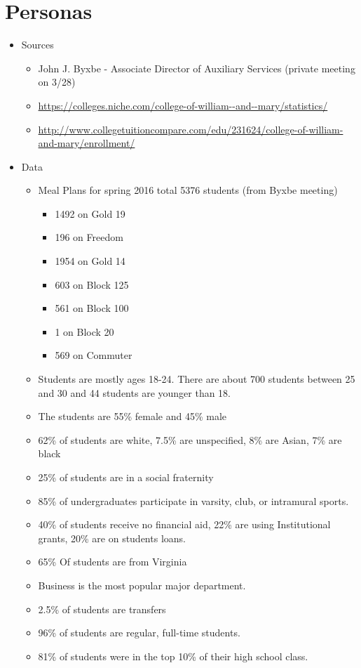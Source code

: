 \documentclass[5pt]{article} %
\begin{document}
\section{Personas}

\begin{itemize}
\item Sources
\begin{itemize}
\item John J. Byxbe - Associate Director of Auxiliary Services (private meeting on 3/28)
\item \url{https://colleges.niche.com/college-of-william--and--mary/statistics/}
\item \url{http://www.collegetuitioncompare.com/edu/231624/college-of-william-and-mary/enrollment/}
\end{itemize}
\item Data
\begin{itemize}
\item Meal Plans for spring 2016 total 5376 students (from Byxbe meeting)
\begin{itemize}
\item 1492 on Gold 19
\item 196 on Freedom
\item 1954 on Gold 14
\item 603 on Block 125
\item 561 on Block 100
\item 1 on Block 20
\item 569 on Commuter
\end{itemize}
\item Students are mostly ages 18-24. There are about 700 students between 25 and 30 and 44 students are younger than 18.
\item The students are 55\% female and 45\% male
\item 62\% of students are white, 7.5\% are unspecified, 8\% are Asian, 7\% are black
\item 25\% of students are in a social fraternity
\item 85\% of undergraduates participate in varsity, club, or intramural sports.
\item 40\% of students receive no financial aid, 22\% are using Institutional grants, 20\% are on students loans.
\item 65\% Of students are from Virginia
\item Business is the most popular major department.
\item 2.5\% of students are transfers
\item 96\% of students are regular, full-time students.
\item 81\% of students were in the top 10\% of their high school class.
\end{itemize}
\end{itemize}
\end{document}
